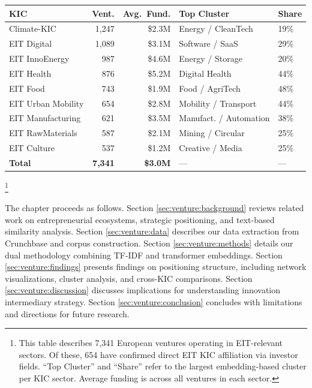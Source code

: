\documentclass[../main.tex]{subfiles}
\begin{document}
\begin{center}
\scriptsize
\setlength{\tabcolsep}{3pt}
\begin{tabular}{lrrll}
\toprule
\textbf{KIC} & \textbf{Vent.} & \textbf{Avg.~Fund.} & \textbf{Top Cluster} & \textbf{Share} \\
\midrule
Climate-KIC        & 1,247 & \$2.3M & Energy / CleanTech    & 19\% \\
EIT Digital        & 1,089 & \$3.1M & Software / SaaS       & 29\% \\
EIT InnoEnergy     &   987 & \$4.6M & Energy / Storage      & 20\% \\
EIT Health         &   876 & \$5.2M & Digital Health        & 44\% \\
EIT Food           &   743 & \$1.9M & Food / AgriTech       & 48\% \\
EIT Urban Mobility &   654 & \$2.8M & Mobility / Transport  & 44\% \\
EIT Manufacturing  &   621 & \$3.5M & Manufact. / Automation & 38\% \\
EIT RawMaterials   &   587 & \$2.1M & Mining / Circular     & 25\% \\
EIT Culture        &   537 & \$1.2M & Creative / Media      & 25\% \\
\midrule
\textbf{Total}     & \textbf{7,341} & \textbf{\$3.0M} & --- & --- \\
\bottomrule
\end{tabular}
\footnote{This table describes 7,341 European ventures operating in EIT-relevant sectors. Of these, 654 have confirmed direct EIT KIC affiliation via investor fields. ``Top Cluster'' and ``Share'' refer to the largest embedding-based cluster per KIC sector. Average funding is across all ventures in each sector.}
\end{center}

The chapter proceeds as follows. Section \ref{sec:venture:background} reviews related work on entrepreneurial ecosystems, strategic positioning, and text-based similarity analysis. Section \ref{sec:venture:data} describes our data extraction from Crunchbase and corpus construction. Section \ref{sec:venture:methods} details our dual methodology combining TF-IDF and transformer embeddings. Section \ref{sec:venture:findings} presents findings on positioning structure, including network visualizations, cluster analysis, and cross-KIC comparisons. Section \ref{sec:venture:discussion} discusses implications for understanding innovation intermediary strategy. Section \ref{sec:venture:conclusion} concludes with limitations and directions for future research.
\end{document}
